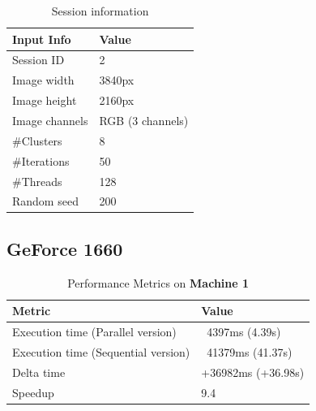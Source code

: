     \begin{table}[H]
        \centering
        \begin{tabular}{|l|l|}
        \hline
        \textbf{Input Info}                    & \textbf{Value}                       \\ \hline
        Session ID                             & 2                                     \\ \hline
        Image width                            & 3840px                                \\ \hline
        Image height                           & 2160px                                \\ \hline
        Image channels                         & RGB (3 channels)                      \\ \hline
        \#Clusters                             & 8                                     \\ \hline
        \#Iterations                           & 50                                    \\ \hline
        \#Threads                              & 128                                   \\ \hline
        Random seed                            & 200                                   \\ \hline
        \end{tabular}
        \caption{Session information}
        \label{tab:session_information_test3}
        \end{table}
        
        \subsection{GeForce 1660}

        \begin{table}[H]
            \centering
            \begin{tabular}{|l|l|}
            \hline
            \textbf{Metric}                         & \textbf{Value}                       \\ \hline
            Execution time (Parallel version)       & ~4397ms (4.39s)                       \\ \hline
            Execution time (Sequential version)     & ~41379ms (41.37s)                     \\ \hline
            Delta time                               & +36982ms (+36.98s)                    \\ \hline
            Speedup                                  & 9.4                                    \\ \hline
            \end{tabular}
            \caption{Performance Metrics on \textbf{Machine 1}}
            \label{table:performance_metrics_test3_machine1}
        \end{table}
        
